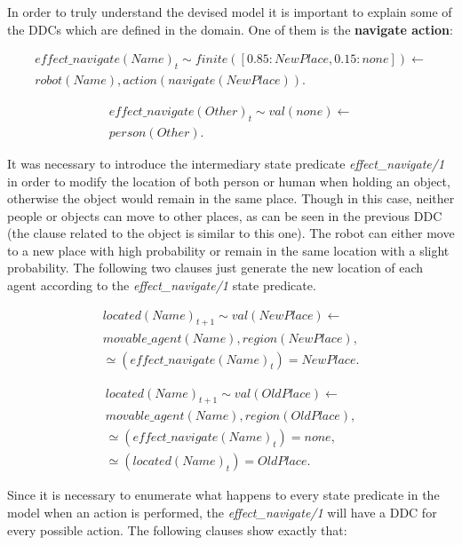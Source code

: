 In order to truly understand the devised model it is important to explain some of the \glspl{DDC}
which are defined in the domain.
One of them is the \textbf{navigate action}:

\begin{align*} 
    effect\_navigate(Name)_t \sim finite([0.85:NewPlace, 0.15:none]) \leftarrow \\
    robot(Name), action(navigate(NewPlace)).
\end{align*}

\begin{align*} 
    effect\_navigate(Other)_t \sim val(none) \leftarrow \\
    person(Other).
\end{align*}  

It was necessary to introduce the intermediary state predicate \textit{effect\_navigate/1} in order 
to modify the location of both person or human when holding an object, otherwise the object would
remain in the same place. Though in this case, neither people or objects can move to other places, 
as can be seen in the previous \gls{DDC} (the clause related to the object is similar to this one). 
The robot can either move to a new place with high probability or remain in the same location with 
a slight probability. The following two clauses just generate the new location of each agent according 
to the \textit{effect\_navigate/1} state predicate.

\begin{align*} 
    located(Name)_{t+1} \sim val(NewPlace) \leftarrow \\
	movable\_agent(Name), region(NewPlace),\\
    \simeq(effect\_navigate(Name)_t) = NewPlace.
\end{align*}

\begin{align*} 
    located(Name)_{t+1} \sim val(OldPlace) \leftarrow \\
	movable\_agent(Name), region(OldPlace),\\
    \simeq(effect\_navigate(Name)_t) = none,\\
    \simeq(located(Name)_t) = OldPlace.
\end{align*}

Since it is necessary to enumerate what happens to every state predicate in the model when an action is 
performed, the \textit{effect\_navigate/1} will have a \gls{DDC} for every possible action. The following 
clauses show exactly that:

